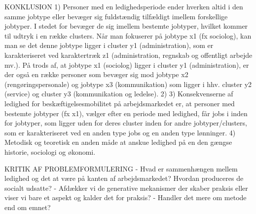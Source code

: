 KONKLUSION
1) Personer med en ledighedsperiode ender hverken altid i den samme jobtype eller bevæger sig fuldstændig tilfældigt imellem forskellige jobtyper. I stedet for bevæger de sig imellem bestemte jobtyper, hvilket kommer til udtryk i en række clusters. Når man fokuserer på jobtype x1 (fx sociolog), kan man se det denne jobtype ligger i cluster y1 (administration), som er karakteriseret ved karaktertræk z1 (administration, regnskab og offentligt arbejde mv.). På trods af, at jobtype x1 (sociolog) ligger i cluster y1 (administration), er der også en række personer som bevæger sig mod jobtype x2 (rengøringspersonale) og jobtype x3 (kommunikation) som ligger i hhv. cluster y2 (service) og cluster y3 (kommunikation og ledelse).
2) 
3) Konsekvenserne af ledighed for beskæftigelsesmobilitet på arbejdsmarkedet er, at personer med bestemte jobtyper (fx x1), vælger efter en periode med ledighed, får jobs i inden for jobtyper, som ligger uden for deres cluster inden for andre jobtyper/clusters, som er karakteriseret ved en anden type jobs og en anden type lønninger.
4) Metodisk og teoretisk en anden måde at anskue ledighed på en den gængse historie, sociologi og økonomi.

KRITIK AF PROBLEMFORMULERING
- Hvad er sammenhængen mellem ledighed og det at være på kanten af arbejdsmarkedet? Hvordan produceres de socialt udsatte?
- Afdækker vi de generative mekanismer der skaber praksis eller viser vi bare et aspekt og kalder det for praksis?
- Handler det mere om metode end om emnet?





